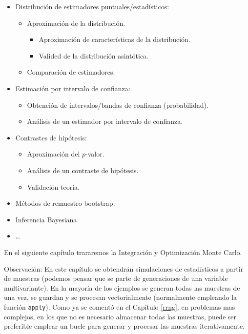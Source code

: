 \documentclass[
]{book}
\theoremstyle{break}
\theoremstyle{definition}
\theoremstyle{definition}
\theoremstyle{definition}
\theoremstyle{definition}
\theoremstyle{remark}
\begin{document}
\begin{itemize}
\item
  Distribución de estimadores puntuales/estadísticos:

  \begin{itemize}
  \item
    Aproximación de la distribución.

    \begin{itemize}
    \item
      Aproximación de características de la distribución.
    \item
      Valided de la distribución asintótica.
    \end{itemize}
  \item
    Comparación de estimadores.
  \end{itemize}
\item
  Estimación por intervalo de confianza:

  \begin{itemize}
  \item
    Obtención de intervalos/bandas de confianza (probabilidad).
  \item
    Análisis de un estimador por intervalo de confianza.
  \end{itemize}
\item
  Contrastes de hipótesis:

  \begin{itemize}
  \item
    Aproximación del \(p\)-valor.
  \item
    Análisis de un contraste de hipótesis.
  \item
    Validación teoría.
  \end{itemize}
\item
  Métodos de remuestro bootstrap.
\item
  Inferencia Bayesiana
\item
  \ldots{}
\end{itemize}

En el siguiente capítulo trararemos la Integración y Optimización Monte Carlo.

Observación:
En este capítulo se obtendrán simulaciones de estadísticos a partir de muestras (podemos pensar que se parte de generaciones de una variable multivariante).
En la mayoría de los ejemplos se generan todas las muestras de una vez, se guardan y se procesan vectorialmente (normalmente empleando la función \texttt{apply}).
Como ya se comentó en el Capítulo \ref{rrng}, en problemas mas complejos, en los que no es necesario almacenar todas las muestras, puede ser preferible emplear un bucle para generar y procesar las muestras iterativamente.
\end{document}
